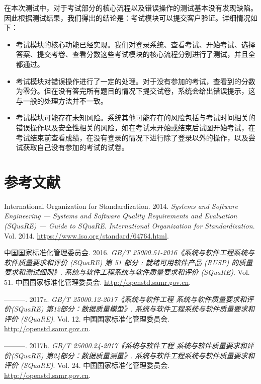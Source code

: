 \documentclass[hyperref, a4paper]{ctexart}
\begin{document}
在本次测试中，对于考试部分的核心流程以及错误操作的测试基本没有发现缺陷。因此根据测试结果，我们得出的结论是：考试模块可以提交客户验证。详细情况如下：

\begin{itemize}
\item
  考试模块的核心功能已经实现。我们对登录系统、查看考试、开始考试、选择答案、提交考卷、查看分数这些考试模块的核心流程分别进行了测试，并且全都通过。
\item
  考试模块对错误操作进行了一定的处理。对于没有参加的考试，查看到的分数为零分。但在没有答完所有题目的情况下提交试卷，系统会给出错误提示，这与一般的处理方法并不一致。
\item
  考试模块可能存在未知风险。系统其他可能存在的风险包括与考试时间相关的错误操作以及安全性相关的风险，如在考试未开始或结束后试图开始考试，在考试结束前查看成绩，在没有登录的情况下进行除了登录以外的操作，以及尝试获取自己没有参加的考试的试卷。
\end{itemize}

\pagebreak

\hypertarget{ux53c2ux8003ux6587ux732e}{%
\section*{参考文献}\label{ux53c2ux8003ux6587ux732e}}

\hypertarget{refs}{}
\leavevmode\hypertarget{ref-innovativeInternationalisation}{}%
International Organization for Standardization. 2014. \emph{Systems and
Software Engineering --- Systems and Software Quality Requirements and
Evaluation (SQuaRE) --- Guide to SQuaRE}. \emph{International
Organization for Standardization}. Vol. 2014.
\url{https://www.iso.org/standard/64764.html}.

\leavevmode\hypertarget{ref-innovative1}{}%
中国国家标准化管理委员会. 2016. \emph{GB/T
25000.51-2016《系统与软件工程系统与软件质量要求和评价 (SQuaRE) 第 51
部分 : 就绪可用软件产品 (RUSP) 的质量要求和测试细则》}.
\emph{系统与软件工程系统与软件质量要求和评价 (SQuaRE)}. Vol. 51.
中国国家标准化管理委员会. \url{http://openstd.samr.gov.cn}.

\leavevmode\hypertarget{ref-innovative3}{}%
---------. 2017a. \emph{GB/T 25000.12-2017《系统与软件工程
系统与软件质量要求和评价(SQuaRE) 第12部分：数据质量模型》}.
\emph{系统与软件工程系统与软件质量要求和评价 (SQuaRE)}. Vol. 12.
中国国家标准化管理委员会. \url{http://openstd.samr.gov.cn}.

\leavevmode\hypertarget{ref-innovative4}{}%
---------. 2017b. \emph{GB/T 25000.24-2017《系统与软件工程
系统与软件质量要求和评价(SQuaRE) 第24部分：数据质量测量》}.
\emph{系统与软件工程系统与软件质量要求和评价 (SQuaRE)}. Vol. 24.
中国国家标准化管理委员会. \url{http://openstd.samr.gov.cn}.
\end{document}
